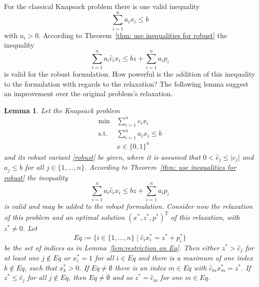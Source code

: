 \documentclass[titlepage, a4paper]{amsbook}
\theoremstyle{plain}
\newtheorem{lem}[thm]{Lemma}
\theoremstyle{break}
\theoremstyle{definition}
\theoremstyle{remark}
\numberwithin{equation}{thm}
\begin{document}
For the classical Knapsack problem there is one valid inequality \[\sum_{i=1}^n a_i x_i \leq b\]
with $a_i > 0$. According to Theorem~\ref{thm: use inequalities for robust} the inequality
\[\sum_{i=1}^n a_i \hat{c}_i x_i \leq bz + \sum_{i=1}^n a_i p_i\]
is valid for the robust formulation. How powerful is the addition of this inequality to the formulation with regards to the relaxation? The following lemma suggest an improvement over the original problem's relaxation.
\begin{lem}\label{lem:additional knapsack ineq}
Let the Knapsack problem 
\begin{align*}
    \min\, &\sum_{i=1}^n c_ix_i \\
    \text{s.t. } &\sum_{i=1}^n a_ix_i \leq b \\
    &x \in \{0,1\}^n
\end{align*}
and its robust variant \eqref{robust} be given, where it is assumed that $0 < \hat{c}_j \leq \vert c_j \vert$ and $a_j \leq b$ for all $j \in \{1, \ldots, n\}$. According to
Theorem~\ref{thm: use inequalities for robust} the inequality 
\[\sum_{i=1}^n a_i \hat{c}_i x_i \leq bz + \sum_{i=1}^n a_i p_i\]
is valid and may be added to the robust formulation. Consider now the relaxation of this problem and an optimal solution $(x^*,z^*,p^*)^T$ of this relaxation, with $z^* \neq 0$. Let 
\[Eq:=\{i \in \{1, \ldots, n\} \mid \hat{c}_ix^*_i=z^*+p^*_i\}\]
be the set of indices as in Lemma~\ref{lem:restriction on Eq}.
Then either $z^* > \hat{c}_j$ for at least one $j \notin Eq$ or 
$x^*_i=1$ for all $i \in Eq$ and there is a maximum of one index $k \notin Eq$, such that $x^*_k > 0$. If $Eq \neq \emptyset$ there is an index $m \in Eq$ with $\hat{c}_m x^*_m = z^*$. If $z^* \leq \hat{c}_j$ for all $j \notin Eq$, then $Eq \neq \emptyset$ and so $z^*=\hat{c}_m$ for one $m \in Eq$.
\end{lem}
\end{document}
